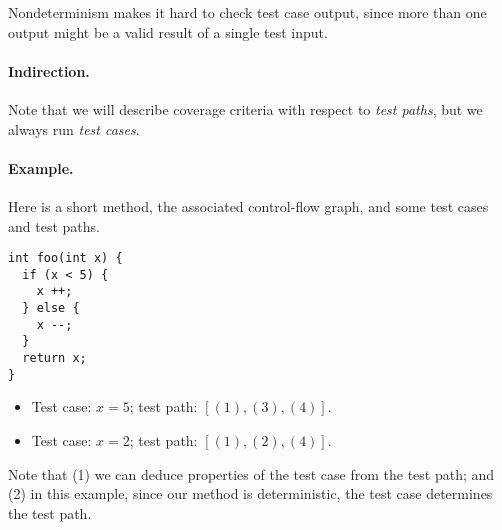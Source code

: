 \documentclass[11pt]{article}
\begin{document}
Nondeterminism makes it hard to check test case output, since more
than one output might be a valid result of a single test input.

\paragraph{Indirection.} Note that we will describe coverage criteria
with respect to \emph{test paths}, but we always run \emph{test cases}.

\newpage
\paragraph{Example.} Here is a short method, the associated control-flow
graph, and some test cases and test paths.

\begin{center}
\begin{minipage}{10em}
\vspace*{-8em}
\begin{lstlisting}
int foo(int x) {
  if (x < 5) {
    x ++;
  } else {
    x --;
  }
  return x;
}
\end{lstlisting}
\end{minipage}
\end{center}

\begin{itemize}
\item Test case: $x = 5$; test path: $[(1), (3), (4)]$.
\item Test case: $x = 2$; test path: $[(1), (2), (4)]$.
\end{itemize}

Note that (1) we can deduce properties of the test case from the test path; and
(2) in this example, since our method is deterministic, the test case 
determines the test path.
\end{document}
